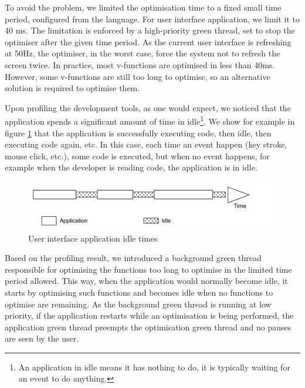 \documentclass[a4paper,12pt,twoside]{../includes/ThesisStyle}
\begin{document}
To avoid the problem, we limited the optimisation time to a fixed small time period, configured from the language. For user interface application, we limit it to 40 ms. The limitation is enforced by a high-priority green thread, set to stop the optimiser after the given time period. As the current user interface is refreshing at 50Hz, the optimiser, in the worst case, force the system not to refresh the screen twice. In practice, most v-functions are optimised in less than 40ms. However, some v-functions are still too long to optimise, so an alternative solution is required to optimise them.

Upon profiling the development tools, as one would expect, we noticed that the application spends a significant amount of time in idle\footnote{An application in idle means it has nothing to do, it is typically waiting for an event to do anything.}. We show for example in figure \ref{fig:ApplicationIdle} that the application is successfully executing code, then idle, then executing code again, etc. In this case, each time an event happen (key stroke, mouse click, etc.), some code is executed, but when no event happens, for example when the developer is reading code, the application is in idle.

\begin{figure}[h!]
    \begin{center}
        \includegraphics[width=0.95\linewidth]{ApplicationIdle}
        \caption{User interface application idle times}
        \label{fig:ApplicationIdle}
    \end{center}
\end{figure}

Based on the profiling result, we introduced a background green thread responsible for optimising the functions too long to optimise in the limited time period allowed. This way, when the application would normally become idle, it starts by optimising such functions and becomes idle when no functions to optimise are remaining. As the background green thread is running at low priority, if the application restarts while an optimisation is being performed, the application green thread preempts the optimisation green thread and no pauses are seen by the user.
\end{document}

